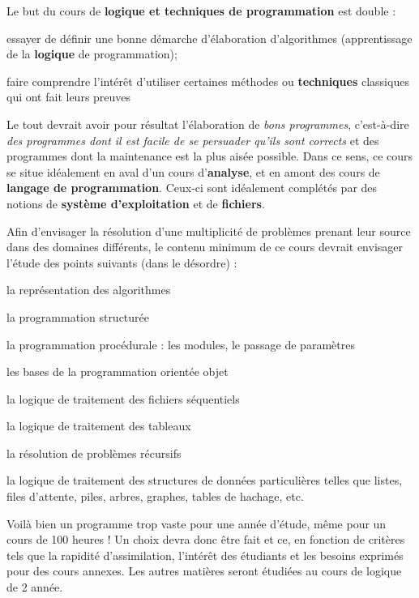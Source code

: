 	Le but du cours de \textbf{logique et techniques de programmation} est
	double :

	\begin{liste}
	\item
		essayer de définir une bonne démarche d’élaboration d’algorithmes
		(apprentissage de la \textbf{logique} de programmation);
	\item
		faire comprendre l’intérêt d’utiliser certaines méthodes ou
		\textbf{techniques} classiques qui ont fait leurs preuves
	\end{liste}

	Le tout devrait avoir pour résultat l’élaboration de \textit{bons
	programmes}, c’est-à-dire \textit{des programmes dont il est facile de
	se persuader qu’ils sont corrects} et des programmes dont la
	maintenance est la plus aisée possible. Dans ce sens, ce cours se situe
	idéalement en aval d’un cours d’\textbf{analyse}, et en amont des cours
	de \textbf{langage de programmation}. Ceux-ci sont idéalement complétés
	par des notions de \textbf{système d’exploitation} et de
	\textbf{fichiers}.

	Afin d’envisager la résolution d’une multiplicité de problèmes prenant
	leur source dans des domaines différents, le contenu minimum de ce
	cours devrait envisager l’étude des points suivants (dans le désordre)
	:

	\begin{liste}
	\item 
		la représentation des algorithmes
	\item
		la programmation structurée
	\item
		la programmation procédurale : les modules, le passage de paramètres
	\item
		les bases de la programmation orientée objet
	\item
		la logique de traitement des fichiers séquentiels
	\item
		la logique de traitement des tableaux
	\item
		la résolution de problèmes récursifs
	\item
		la logique de traitement des structures de données particulières telles
		que listes, files d’attente, piles, arbres, graphes, tables de hachage,
		etc.
	\end{liste}

	Voilà bien un programme trop vaste pour une année d’étude, même pour un
	cours de 100 heures ! Un choix devra donc être fait et ce, en fonction
	de critères tels que la rapidité d’assimilation, l’intérêt des
	étudiants et les besoins exprimés pour des cours annexes. Les autres
	matières seront étudiées au cours de logique de 2
	année.

